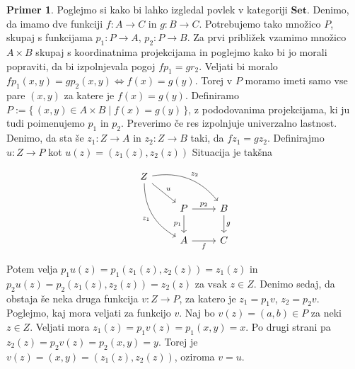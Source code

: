 \documentclass[12pt,a4paper]{book}
\theoremstyle{definition}
\theoremstyle{plain}
\theoremstyle{definition}
\newtheorem{primer}{Primer}[section]
\theoremstyle{remark}
\newcommand{\cat}[1]{\textbf{#1}}
\renewcommand{\set}[1]{\{\,#1\,\}}
\begin{document}
\begin{primer}
Poglejmo si kako bi lahko izgledal povlek v kategoriji $\cat{Set}$. Denimo, da imamo dve funkciji $f : A \to C$ in $g : B \to C$. Potrebujemo tako množico $P$, skupaj s funkcijama $p_1 : P \to A$, $p_2 : P \to B$. Za prvi približek vzamimo množico $A \times B$ skupaj s koordinatnima projekcijama in poglejmo kako bi jo morali popraviti, da bi izpolnjevala pogoj $fp_1 = gr_2$. Veljati bi moralo $fp_1(x,y) = gp_2(x,y) \Leftrightarrow f(x) = g(y)$. Torej v $P$ moramo imeti samo vse pare $(x,y)$ za katere je $f(x) = g(y)$. Definiramo $P := \set{(x,y) \in A \times B \mid f(x) = g(y)}$, z pododovanima projekcijama, ki ju tudi poimenujemo $p_1$ in $p_2$. Preverimo če res izpolnjuje univerzalno lastnost. Denimo, da sta še $z_1 : Z \to A$ in $z_2 : Z \to B$ taki, da $fz_1 = gz_2$. Definirajmo $u : Z \to P$ kot $u(z) = (z_1(z), z_2(z))$
Situacija je takšna

$$\begin{tikzcd}
Z
\arrow[drr, bend left, "z_2"]
\ar[dr, "u"]
\arrow[ddr, bend right, "z_1"'] & & \\
& P \arrow[r, "p_2"] \arrow[d, "p_1"']
& B \arrow[d, "g"] \\
& A \arrow[r, "f"']
& C
\end{tikzcd}$$

Potem velja $p_1u(z) = p_1(z_1(z),z_2(z)) = z_1(z)$ in $p_2u(z) = p_2(z_1(z),z_2(z)) = z_2(z)$ za vsak $z \in Z$. Denimo sedaj, da obstaja še neka druga funkcija $v : Z \to P$, za katero je $z_1 = p_1v$, $z_2 = p_2v$. Poglejmo, kaj mora veljati za funkcijo $v$. Naj bo $v(z) = (a,b) \in P$ za neki $z \in Z$. Veljati mora $z_1(z) = p_1v(z) = p_1(x,y) = x$. Po drugi strani pa $z_2(z) = p_2v(z) = p_2(x,y) = y$. Torej je $v(z) = (x,y) = (z_1(z),z_2(z))$, oziroma $v = u$.
\end{primer}
\end{document}

